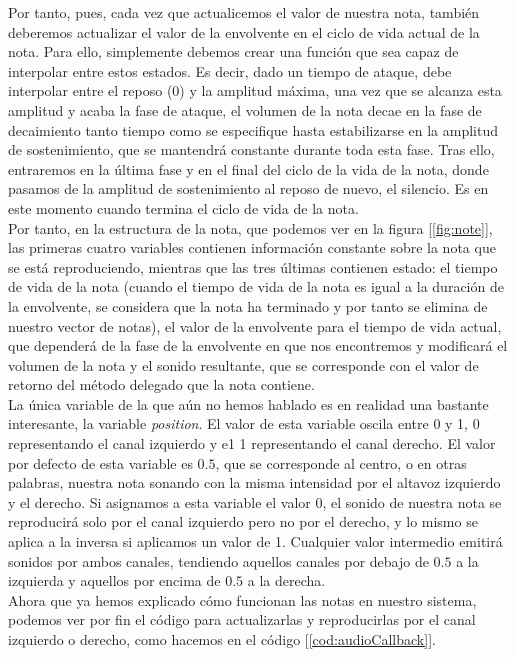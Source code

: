 Por tanto, pues, cada vez que actualicemos el valor de nuestra nota, también deberemos actualizar el valor de la envolvente en el ciclo de vida actual de la nota. Para ello, simplemente debemos crear una función que sea capaz de interpolar entre estos estados. Es decir, dado un tiempo de ataque, debe interpolar entre el reposo (0) y la amplitud máxima, una vez que se alcanza esta amplitud y acaba la fase de ataque, el volumen de la nota decae en la fase de decaimiento tanto tiempo como se especifique hasta estabilizarse en la amplitud de sostenimiento, que se mantendrá constante durante toda esta fase. Tras ello, entraremos en la última fase y en el final del ciclo de la vida de la nota, donde pasamos de la amplitud de sostenimiento al reposo de nuevo, el silencio. Es en este momento cuando termina el ciclo de vida de la nota.\\

Por tanto, en la estructura de la nota, que podemos ver en la figura [\ref{fig:note}], las primeras cuatro variables contienen información constante sobre la nota que se está reproduciendo, mientras que las tres últimas contienen estado: el tiempo de vida de la nota (cuando el tiempo de vida de la nota es igual a la duración de la envolvente, se considera que la nota ha terminado y por tanto se elimina de nuestro vector de notas), el valor de la envolvente para el tiempo de vida actual, que dependerá de la fase de la envolvente en que nos encontremos y modificará el volumen de la nota y el sonido resultante, que se corresponde con el valor de retorno del método delegado que la nota contiene.\\

La única variable de la que aún no hemos hablado es en realidad una bastante interesante, la variable \emph{position}. El valor de esta variable oscila entre 0 y 1, 0 representando el canal izquierdo y e1 1 representando el canal derecho. El valor por defecto de esta variable es \(0.5\), que se corresponde al centro, o en otras palabras, nuestra nota sonando con la misma intensidad por el altavoz izquierdo y el derecho. Si asignamos a esta variable el valor 0, el sonido de nuestra nota se reproducirá solo por el canal izquierdo pero no por el derecho, y lo mismo se aplica a la inversa si aplicamos un valor de 1. Cualquier valor intermedio emitirá sonidos por ambos canales, tendiendo aquellos canales por debajo de \(0.5\) a la izquierda y aquellos por encima de \(0.5\) a la derecha.\\

Ahora que ya hemos explicado cómo funcionan las notas en nuestro sistema, podemos ver por fin el código para actualizarlas y reproducirlas por el canal izquierdo o derecho, como hacemos en el código [\ref{cod:audioCallback}].\\

